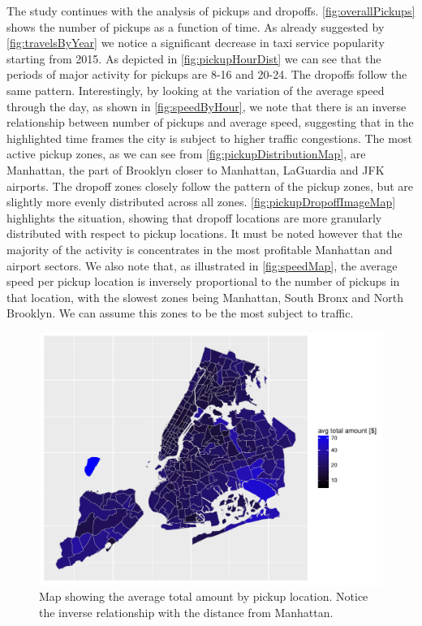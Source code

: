 \documentclass{acm_proc_article-sp-sigmod09}
\begin{document}
The study continues with the analysis of pickups and dropoffs. \cref{fig:overallPickups} shows the number of pickups as a function of time. As already suggested by \cref{fig:travelsByYear} we notice a significant decrease in taxi service popularity starting from 2015. As depicted in \cref{fig:pickupHourDist} we can see that the periods of major activity for pickups are 8-16 and 20-24. The dropoffs follow the same pattern. Interestingly, by looking at the variation of the average speed through the day, as shown in \cref{fig:speedByHour}, we note that there is an inverse relationship between number of pickups and average speed, suggesting that in the highlighted time frames the city is subject to higher traffic congestions.
The most active pickup zones, as we can see from \cref{fig:pickupDistributionMap}, are Manhattan, the part of Brooklyn closer to Manhattan, LaGuardia and JFK airports. The dropoff zones closely follow the pattern of the pickup zones, but are slightly more evenly distributed across all zones. \cref{fig:pickupDropoffImageMap} highlights the situation, showing that dropoff locations are more granularly distributed with respect to pickup locations. It must be noted however that the majority of the activity is concentrates in the most profitable Manhattan and airport sectors.
We also note that, as illustrated in \cref{fig:speedMap}, the average speed per pickup location is inversely proportional to the number of pickups in that location, with the slowest zones being Manhattan, South Bronx and North Brooklyn. We can assume this zones to be the most subject to traffic.

\begin{figure}
	\centering
	\includegraphics[width=1\columnwidth]{resources/base_plots/avg_total_amount_by_pickup_location_map.pdf}
	\caption{Map showing the average total amount by pickup location. Notice the inverse relationship with the distance from Manhattan.}
	\label{fig:totalAmountMap}
\end{figure}
\end{document}
